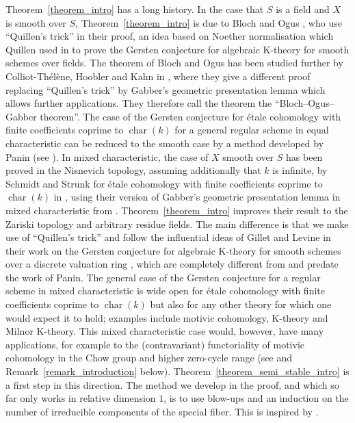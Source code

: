 \documentclass[11pt]{amsart}
\numberwithin{equation}{section}
\newtheorem{Key lemma}[theorem]{Key lemma}
\theoremstyle{definition}
\theoremstyle{remark}
\DeclareMathOperator{\Char}{char}
\begin{document}
Theorem~\ref{theorem_intro} has a long history.
In the case that $S$ is a field and $X$ is smooth over $S$, Theorem~\ref{theorem_intro} is due to Bloch and Ogus \cite{BO74}, who use ``Quillen's trick'' in their proof, an idea based on Noether normalisation which Quillen used in \cite{Qu72} to prove the Gersten conjecture for algebraic K-theory for smooth schemes over fields. The theorem of Bloch and Ogus has been studied further by Colliot-Th\'el\`ene, Hoobler and Kahn in \cite{CHK97}, where they give a different proof replacing ``Quillen's trick'' by Gabber's geometric presentation lemma which allows further applications. They therefore call the theorem the ``Bloch--Ogus--Gabber theorem''. The case of the Gersten conjecture for \'etale cohomology with finite coefficients coprime to $\Char(k)$ for a general regular scheme in equal characteristic can be reduced to the smooth case by a method developed by Panin (see \cite[Section~5]{Pa03}). In mixed characteristic, the case of $X$ smooth over $S$ has been proved in the Nisnevich topology, assuming additionally that $k$ is infinite, by Schmidt and Strunk for \'etale cohomology with finite coefficients coprime to $\Char(k)$ in \cite{SS19}, using their version of Gabber's geometric presentation lemma in mixed characteristic from \cite{SS18}. Theorem~\ref{theorem_intro} improves their result to the Zariski topology and arbitrary residue fields. The main difference is that we make use of ``Quillen's trick'' and follow the influential ideas of Gillet and Levine in their work on the Gersten conjecture for algebraic K-theory for smooth schemes over a discrete valuation ring \cite{GL87}, which are completely different from and predate the work of Panin. The general case of the Gersten conjecture for a regular scheme in mixed characteristic is wide open for \'etale cohomology with finite coefficients coprime to $\Char(k)$ but also for any other theory for which one would expect it to hold; examples include motivic cohomology, K-theory and Milnor K-theory. This mixed characteristic case would, however, have many applications, for example to the (contravariant) functoriality of motivic cohomology in the Chow group and higher zero-cycle range (see \cite{KEW16} and Remark~\ref{remark_introduction} below). Theorem~\ref{theorem_semi_stable_intro} is a first step in this direction. The method we develop in the proof, and which so far only works in relative dimension $1$, is to use blow-ups and an induction on the number of irreducible components of the special fiber. This is inspired by \cite[Section~3]{Hyodo1988}. 
\end{document}
